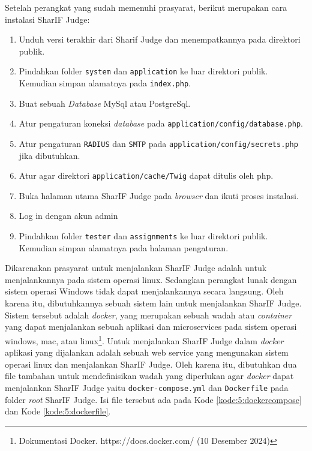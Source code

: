 \documentclass[a4paper,twoside]{article}
\begin{document}
\begin{enumerate}
\begin{itemize}
		            Setelah perangkat yang sudah memenuhi prasyarat, berikut merupakan cara instalasi SharIF Judge:

		            \vspace{0.25cm}
		            \begin{enumerate}
			            \item Unduh versi terakhir dari Sharif Judge dan menempatkannya pada direktori publik.
			            \item Pindahkan folder \texttt{system} dan \texttt{application} ke luar direktori publik. Kemudian simpan alamatnya pada \texttt{index.php}.
			            \item Buat sebuah \textit{Database} MySql atau PostgreSql.
			            \item Atur pengaturan koneksi \textit{database} pada \texttt{application/config/database.php}.
			            \item Atur pengaturan \texttt{RADIUS} dan \texttt{SMTP} pada \texttt{application/config/secrets.php} jika dibutuhkan.
			            \item Atur agar direktori \texttt{application/cache/Twig} dapat ditulis oleh php.
			            \item Buka halaman utama SharIF Judge pada \textit{browser} dan ikuti proses instalasi.
			            \item Log in dengan akun admin
			            \item Pindahkan folder \texttt{tester} dan \texttt{assignments} ke luar direktori publik. Kemudian simpan alamatnya pada halaman pengaturan.
		            \end{enumerate}
		            \vspace{0.25cm}

		            Dikarenakan prasyarat untuk menjalankan SharIF Judge adalah untuk menjalankannya pada sistem operasi linux. Sedangkan perangkat lunak dengan sistem operasi Windows tidak dapat menjalankannya secara langsung. Oleh karena itu, dibutuhkannya sebuah sistem lain untuk menjalankan SharIF Judge. Sistem tersebut adalah \textit{docker}, yang merupakan sebuah wadah atau \textit{container} yang dapat menjalankan sebuah aplikasi dan microservices pada sistem operasi windows, mac, atau linux\footnote{Dokumentasi Docker. https://docs.docker.com/ (10 Desember 2024)}. Untuk menjalankan SharIF Judge dalam \textit{docker} aplikasi yang dijalankan adalah sebuah web service yang mengunakan sistem operasi linux dan menjalankan SharIF Judge. Oleh karena itu, dibutuhkan dua file tambahan untuk mendefinisikan wadah yang diperlukan agar \textit{docker} dapat menjalankan SharIF Judge yaitu \verb|docker-compose.yml| dan \verb|Dockerfile| pada folder \textit{root} SharIF Judge. Isi file tersebut ada pada Kode \ref{kode:5:dockercompose} dan Kode \ref{kode:5:dockerfile}.


\end{itemize}
\end{enumerate}
\end{document}
